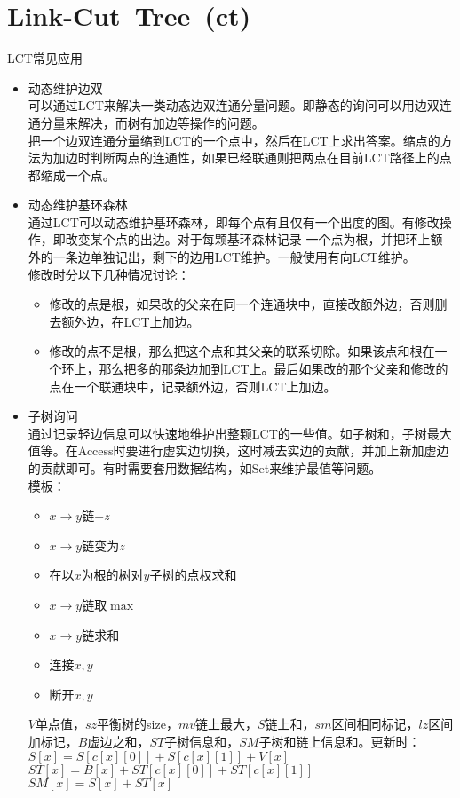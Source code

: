 \section{Link-Cut\ Tree\ \small(ct)}
	LCT常见应用
	\begin{itemize}
		\item 动态维护边双
			\\可以通过LCT来解决一类动态边双连通分量问题。即静态的询问可以用边双连通分量来解决，而树有加边等操作的问题。
			\\把一个边双连通分量缩到LCT的一个点中，然后在LCT上求出答案。缩点的方法为加边时判断两点的连通性，如果已经联通则把两点在目前LCT路径上的点都缩成一个点。
		\item 动态维护基环森林
			\\通过LCT可以动态维护基环森林，即每个点有且仅有一个出度的图。有修改操作，即改变某个点的出边。对于每颗基环森林记录
			一个点为根，并把环上额外的一条边单独记出，剩下的边用LCT维护。一般使用有向LCT维护。
			\\修改时分以下几种情况讨论：
			\begin{itemize}[nosep]
				\item 修改的点是根，如果改的父亲在同一个连通块中，直接改额外边，否则删去额外边，在LCT上加边。
				\item 修改的点不是根，那么把这个点和其父亲的联系切除。如果该点和根在一个环上，那么把多的那条边加到LCT上。最后如果改的那个父亲和修改的点在一个联通块中，记录额外边，否则LCT上加边。
			\end{itemize}
		\item 子树询问
			\\通过记录轻边信息可以快速地维护出整颗LCT的一些值。如子树和，子树最大值等。在Access时要进行虚实边切换，这时减去实边的贡献，并加上新加虚边的贡献即可。有时需要套用数据结构，如Set来维护最值等问题。
			\\模板：
			\begin{itemize}[nosep]
				\item $ x \to y $链$ + z $
				\item $ x \to y $链变为$ z $
				\item 在以$ x $为根的树对$ y $子树的点权求和
				\item $ x \to y $链取$ \max $
				\item $ x \to y $链求和
				\item 连接$ x, y $
				\item 断开$ x, y $
			\end{itemize}
			$ V $单点值，$ sz $平衡树的size，$ mv $链上最大，$ S $链上和，$ sm $区间相同标记，$ lz $区间加标记，$ B $虚边之和，$ ST $子树信息和，$ SM $子树和链上信息和。更新时：
			\\$ S[x] = S[c[x][0]] + S[c[x][1]] + V[x] $
			\\$ ST[x] =B[x] + ST[c[x][0]] + ST[c[x][1]] $
			\\$ SM[x] = S[x] + ST[x] $
	\end{itemize}
	\inputminted{cpp}{GraphTheory/link_cut_tree.cpp}
